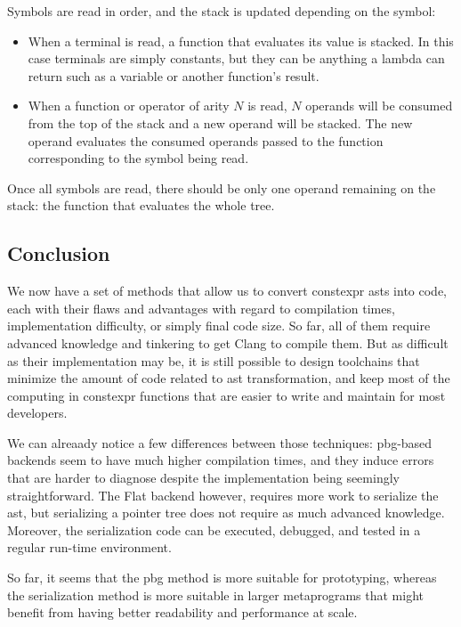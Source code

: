 \documentclass[../main]{subfiles}
\begin{document}
Symbols are read in order, and the stack is updated depending on the symbol:

\begin{itemize}
\item When a terminal is read, a function that evaluates its value is stacked.
In this case terminals are simply constants, but they can be anything a \cpp
lambda can return such as a variable or another function's result.

\item When a function or operator of arity $N$ is read, $N$ operands will be
consumed from the top of the stack and a new operand will be stacked.
The new operand evaluates the consumed operands passed to the function
corresponding to the symbol being read.
\end{itemize}

Once all symbols are read, there should be only one operand remaining
on the stack: the function that evaluates the whole tree.

\subsection{
  Conclusion
}

We now have a set of methods that allow us to convert \gls{constexpr}
\glspl{ast} into \cpp code, each with their flaws and advantages with regard
to compilation times, implementation difficulty, or simply final code size.
So far, all of them require advanced \cpp knowledge and tinkering to get
Clang to compile them. But as difficult as their implementation may be,
it is still possible to design toolchains that minimize the amount of code
related to \gls{ast} transformation, and keep most of the computing in
\gls{constexpr} functions that are easier to write and maintain
for most \cpp developers.

We can alreaady notice a few differences between those techniques:
\gls{pbg}-based backends seem to have much higher compilation times,
and they induce errors that are harder to diagnose despite the implementation
being seemingly straightforward.
The Flat backend however, requires more work to serialize the \gls{ast},
but serializing a pointer tree does not require as much advanced \cpp knowledge.
Moreover, the serialization code can be executed, debugged, and tested in a
regular run-time environment.

So far, it seems that the \gls{pbg} method is more suitable for prototyping,
whereas the serialization method is more suitable in larger metaprograms that
might benefit from having better readability and performance at scale.
\end{document}
